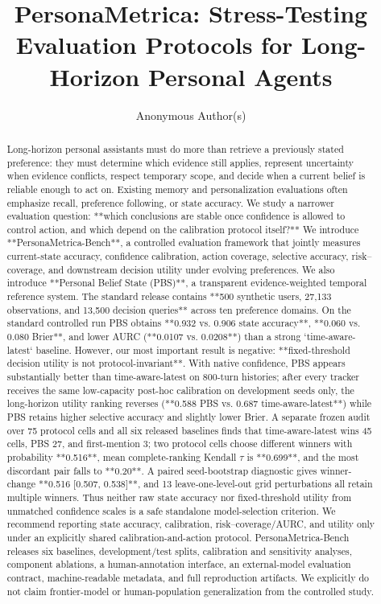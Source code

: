 \documentclass{article}
\title{PersonaMetrica: Stress-Testing Evaluation Protocols for Long-Horizon Personal Agents}
\author{Anonymous Author(s)}
\begin{document}
\maketitle
\begin{abstract}
Long-horizon personal assistants must do more than retrieve a previously stated preference: they must determine which evidence still applies, represent uncertainty when evidence conflicts, respect temporary scope, and decide when a current belief is reliable enough to act on. Existing memory and personalization evaluations often emphasize recall, preference following, or state accuracy. We study a narrower evaluation question: **which conclusions are stable once confidence is allowed to control action, and which depend on the calibration protocol itself?** We introduce **PersonaMetrica-Bench**, a controlled evaluation framework that jointly measures current-state accuracy, confidence calibration, action coverage, selective accuracy, risk–coverage, and downstream decision utility under evolving preferences. We also introduce **Personal Belief State (PBS)**, a transparent evidence-weighted temporal reference system. The standard release contains **500 synthetic users, 27,133 observations, and 13,500 decision queries** across ten preference domains. On the standard controlled run PBS obtains **0.932 vs. 0.906 state accuracy**, **0.060 vs. 0.080 Brier**, and lower AURC (**0.0107 vs. 0.0208**) than a strong `time-aware-latest` baseline. However, our most important result is negative: **fixed-threshold decision utility is not protocol-invariant**. With native confidence, PBS appears substantially better than time-aware-latest on 800-turn histories; after every tracker receives the same low-capacity post-hoc calibration on development seeds only, the long-horizon utility ranking reverses (**0.588 PBS vs. 0.687 time-aware-latest**) while PBS retains higher selective accuracy and slightly lower Brier. A separate frozen audit over 75 protocol cells and all six released baselines finds that time-aware-latest wins 45 cells, PBS 27, and first-mention 3; two protocol cells choose different winners with probability **0.516**, mean complete-ranking Kendall $\tau$ is **0.699**, and the most discordant pair falls to **0.20**. A paired seed-bootstrap diagnostic gives winner-change **0.516 [0.507, 0.538]**, and 13 leave-one-level-out grid perturbations all retain multiple winners. Thus neither raw state accuracy nor fixed-threshold utility from unmatched confidence scales is a safe standalone model-selection criterion. We recommend reporting state accuracy, calibration, risk–coverage/AURC, and utility only under an explicitly shared calibration-and-action protocol. PersonaMetrica-Bench releases six baselines, development/test splits, calibration and sensitivity analyses, component ablations, a human-annotation interface, an external-model evaluation contract, machine-readable metadata, and full reproduction artifacts. We explicitly do not claim frontier-model or human-population generalization from the controlled study.
\end{abstract}



\clearpage

\end{document}
